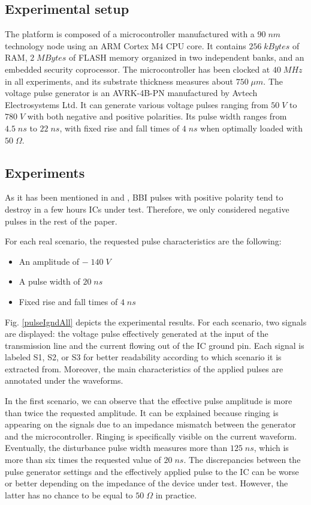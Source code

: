 \documentclass[10pt, conference, compsocconf]{IEEEtran}
\begin{document}
\subsection{Experimental setup}
\label{subsubsection:labSetup}

The platform is composed of a microcontroller manufactured with a $90 \; nm$ technology node using an ARM Cortex M4 CPU core.
It contains $256 \; kBytes$ of RAM, $2 \; MBytes$ of FLASH memory organized in two independent banks, and an embedded security coprocessor.
The microcontroller has been clocked at $40 \; MHz$ in all experiments, and its substrate thickness measures about $750 \; \mu m$.
The voltage pulse generator is an AVRK-4B-PN manufactured by Avtech Electrosystems Ltd.
It can generate various voltage pulses ranging from $50 \; V$ to $780 \; V$ with both negative and positive polarities.
Its pulse width ranges from $4.5 \; ns$ to $22 \; ns$, with fixed rise and fall times of $4 \; ns$ when optimally loaded with $50 \; \Omega$.

\subsection{Experiments}
\label{subsubsection:expSimple}

As it has been mentioned in \cite{mybbi1} and \cite{mybbi2}, BBI pulses with positive polarity tend to destroy in a few hours ICs under test.
Therefore, we only considered negative pulses in the rest of the paper.

For each real scenario, the requested pulse characteristics are the following:
\begin{itemize}
\item An amplitude of $- \; 140 \; V$
\item A pulse width of $20 \; ns$
\item Fixed rise and fall times of $4 \; ns$
\end{itemize}
Fig. \ref{pulseIgndAll} depicts the experimental results.
For each scenario, two signals are displayed: the voltage pulse effectively generated at the input of the transmission line and the current flowing out of the IC ground pin.
Each signal is labeled S1, S2, or S3 for better readability according to which scenario it is extracted from.
Moreover, the main characteristics of the applied pulses are annotated under the waveforms.

In the first scenario, we can observe that the effective pulse amplitude is more than twice the requested amplitude.
It can be explained because ringing is appearing on the signals due to an impedance mismatch between the generator and the microcontroller.
Ringing is specifically visible on the current waveform.
Eventually, the disturbance pulse width measures more than $125 \; ns$, which is more than six times the requested value of $20 \; ns$.
The discrepancies between the pulse generator settings and the effectively applied pulse to the IC can be worse or better depending on the impedance of the device under test.
However, the latter has no chance to be equal to $50 \; \Omega$ in practice.
\end{document}
